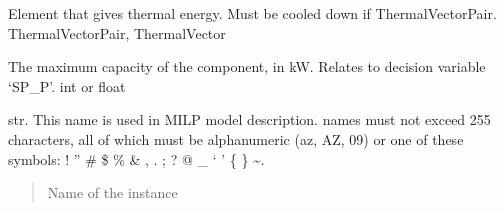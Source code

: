 \documentclass[letterpaper,10pt,english]{sphinxmanual}
\begin{document}
\begin{fulllineitems}
\begin{fulllineitems}
\label{\detokenize{generated/tamos.production.HeatExchanger:tamos.production.HeatExchanger.energy_source}}
\pysigstartsignatures
{}
\pysigstopsignatures
\sphinxAtStartPar
Element that gives thermal energy.
Must be cooled down if ThermalVectorPair.
ThermalVectorPair, ThermalVector

\end{fulllineitems}


\begin{fulllineitems}
\label{\detokenize{generated/tamos.production.HeatExchanger:tamos.production.HeatExchanger.given_sizing}}
\pysigstartsignatures
{}
\pysigstopsignatures
\sphinxAtStartPar
The maximum capacity of the component, in kW.
Relates to decision variable ‘SP\_P’.
int or float

\end{fulllineitems}


\begin{fulllineitems}
\label{\detokenize{generated/tamos.production.HeatExchanger:tamos.production.HeatExchanger.name}}
\pysigstartsignatures
{}
\pysigstopsignatures
\sphinxAtStartPar
str.
This name is used in MILP model description.
names must not exceed 255 characters,
all of which must be alphanumeric (a\sphinxhyphen{}z, A\sphinxhyphen{}Z, 0\sphinxhyphen{}9) or one of these symbols:
! ” \# \$ \% \& , . ; ? @ \_ ‘ ’ \{ \} \textasciitilde{}.
\begin{quote}\begin{description}
\sphinxAtStartPar
Name of the instance

\end{description}\end{quote}

\end{fulllineitems}


\end{fulllineitems}
\end{document}
